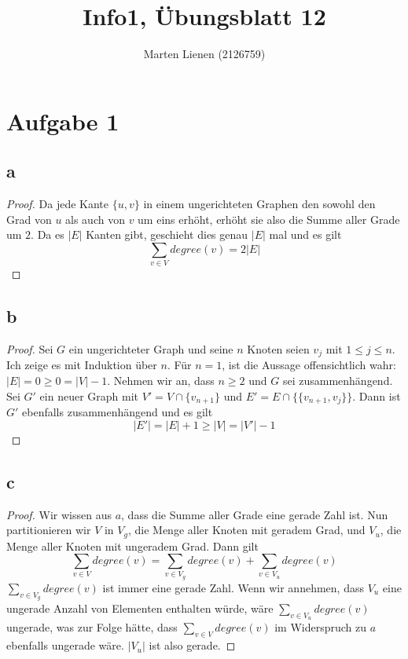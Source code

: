 \documentclass[a4paper,10pt]{article}
\title{Info1, Übungsblatt 12}
\author{Marten Lienen (2126759)}
\begin{document}
\maketitle

\section*{Aufgabe 1}

\subsection*{a}

\begin{proof}
 Da jede Kante $\{u, v\}$ in einem ungerichteten Graphen den sowohl den Grad von $u$ als auch von $v$ um eins erhöht, erhöht sie also die Summe aller Grade um $2$.
 Da es $|E|$ Kanten gibt, geschieht dies genau $|E|$ mal und es gilt
 \begin{equation}
  \sum_{v \in V} degree(v) = 2|E|
 \end{equation}
\end{proof}

\subsection*{b}

\begin{proof}
 Sei $G$ ein ungerichteter Graph und seine $n$ Knoten seien $v_j$ mit $1 \le j \le n$.
 Ich zeige es mit Induktion über $n$.
 Für $n = 1$, ist die Aussage offensichtlich wahr: $|E| = 0 \ge 0 = |V| - 1$.
 Nehmen wir an, dass $n \ge 2$ und $G$ sei zusammenhängend.
 Sei $G'$ ein neuer Graph mit $V' = V \cap \{ v_{n + 1} \}$ und $E' = E \cap \{ \{v_{n + 1}, v_j\} \}$.
 Dann ist $G'$ ebenfalls zusammenhängend und es gilt
 \begin{equation}
  |E'| = |E| + 1 \ge |V| = |V'| - 1
 \end{equation}
\end{proof}

\subsection*{c}

\begin{proof}
 Wir wissen aus $a$, dass die Summe aller Grade eine gerade Zahl ist.
 Nun partitionieren wir $V$ in $V_g$, die Menge aller Knoten mit geradem Grad, und $V_u$, die Menge aller Knoten mit ungeradem Grad.
 Dann gilt
 \begin{equation}
  \sum_{v \in V} degree(v) = \sum_{v \in V_g} degree(v) + \sum_{v \in V_u} degree(v)
 \end{equation}
 $\sum_{v \in V_g} degree(v)$ ist immer eine gerade Zahl.
 Wenn wir annehmen, dass $V_u$ eine ungerade Anzahl von Elementen enthalten würde, wäre $\sum_{v \in V_u} degree(v)$ ungerade, was zur Folge hätte, dass $\sum_{v \in V} degree(v)$ im Widerspruch zu $a$ ebenfalls ungerade wäre.
 $|V_u|$ ist also gerade.
\end{proof}
\end{document}

